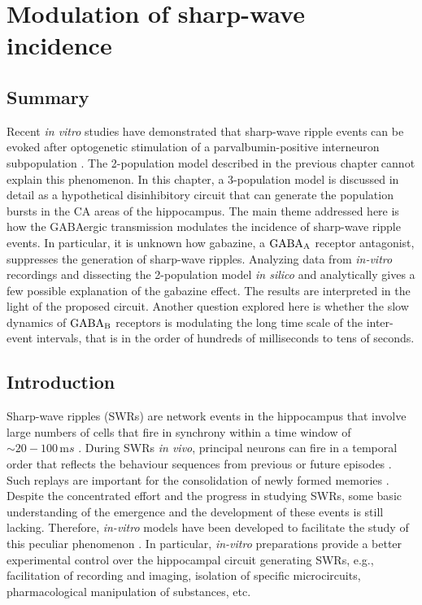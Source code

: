 \chapter{Modulation of sharp-wave incidence}
\label{chap:swr}

\section{Summary}
  Recent \textit{in vitro} studies have demonstrated that sharp-wave ripple
  events can be evoked after optogenetic stimulation of a parvalbumin-positive
  interneuron subpopulation \citep{Schlingloff2014, Kohus2016}. The
  2-population model described in the previous chapter cannot explain this
  phenomenon. In this chapter, a 3-population model is discussed in detail as a
  hypothetical disinhibitory circuit that can generate the population bursts in
  the CA areas of the hippocampus. The main theme addressed here is how the
  GABAergic transmission modulates the incidence of sharp-wave ripple events.
  In particular, it is unknown how gabazine, a $\rm GABA_A$ receptor antagonist,
  suppresses the generation of sharp-wave ripples. Analyzing data from
  \textit{in-vitro} recordings and dissecting the 2-population model \textit{in
  silico} and analytically gives a few possible explanation of the gabazine
  effect. The results are interpreted in the light of the proposed circuit.
  Another question explored here is whether the slow dynamics of $\rm GABA_B$
  receptors is modulating the long time scale of the inter-event intervals,
  that is in the order of hundreds of milliseconds to tens of seconds.

\section{Introduction}
  Sharp-wave ripples (SWRs) are network events in the hippocampus that involve
  large numbers of cells that fire in synchrony within a time window of
  $\sim20-100\, \mathrm ms$ \citep{Buzsaki2015}. During SWRs \textit{in vivo},
  principal neurons can fire in a temporal order that reflects the behaviour
  sequences from previous \citep{Lee2002} or future episodes
  \citep{Dragoi2011}. Such replays are important for the consolidation of newly
  formed memories \citep{Girardeau2009}. Despite the concentrated effort and
  the progress in studying SWRs, some basic understanding of the emergence and
  the development of these events is still lacking. Therefore,
  \textit{in-vitro} models have been developed to facilitate the study of this
  peculiar phenomenon \citep{Maier2003}. In particular, \textit{in-vitro}
  preparations provide a better experimental control over the hippocampal
  circuit generating SWRs, e.g., facilitation of recording and imaging,
  isolation of specific microcircuits, pharmacological manipulation of
  substances, etc.

